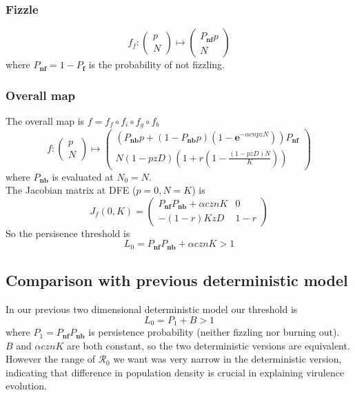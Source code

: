 \documentclass[12pt]{article}
\begin{document}
\subsubsection{Fizzle}
$$f_f:\begin{pmatrix}
    p\\N
\end{pmatrix}
\mapsto \begin{pmatrix}
    P_\textbf{nf}p\\
    N
\end{pmatrix}$$
where $P_\textbf{nf}=1-P_\textbf{f}$ is the probability of not fizzling.

\subsubsection{Overall map}
The overall map is $f=f_f \circ f_i \circ f_g \circ f_b$
$$f:\begin{pmatrix}
    p\\N
\end{pmatrix}
\mapsto \begin{pmatrix}
    (P_\textbf{nb}p+(1-P_\textbf{nb}p)(1-\mathbf{e}^{-\alpha cnpzN}))P_\textbf{nf}\\
    N(1-pzD)(1+r(1-\frac{(1-pzD)N}{K}))
\end{pmatrix}$$
where $P_\textbf{nb}$ is evaluated at $N_0=N$.\\

The Jacobian matrix at DFE ($p=0,N=K$) is
$$J_{f}(0,K)=\begin{pmatrix}
    P_\textbf{nf}P_\textbf{nb}+\alpha cznK&0\\-(1-r)KzD&1-r
\end{pmatrix}$$
So the persisence threshold is
$$L_0=  P_\textbf{nf}P_\textbf{nb}+\alpha cznK>1$$

\subsection{Comparison with previous deterministic model}
In our previous two dimensional deterministic model our threshold is
$$L_0=  P_1+B>1$$ where $P_1=P_\textbf{nf}P_\textbf{nb}$ is persistence probability (neither fizzling nor burning out).\\

$B$ and  $\alpha cznK$ are both constant, so the two deterministic versions are equivalent. However the range of $\mathcal{R}_0$ we want was very narrow in the deterministic version, indicating that difference in population density is crucial in explaining virulence evolution.
\end{document}
